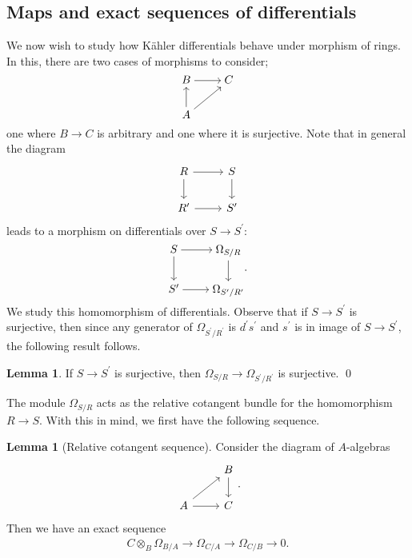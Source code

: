 \documentclass[letterpaper,10pt,twoside]{amsart}
\newcommand{\tens}{\otimes}
\theoremstyle{proposition}
\theoremstyle{definition}
\theoremstyle{theorem}
\theoremstyle{definition}
\theoremstyle{definition}
\theoremstyle{definition}
\theoremstyle{lemma}
\newtheorem{lemma}[proposition]{\textbf{Lemma}}
\theoremstyle{definition}
\theoremstyle{definition}
\theoremstyle{corollary}
\theoremstyle{definition}
\begin{document}
	\subsection{Maps and exact sequences of differentials}
	We now wish to study how K\"ahler differentials behave under morphism of rings. In this, there are two cases of morphisms to consider; 
	\[\begin{tikzcd}[cramped]
		B & C \\
		A
		\arrow[from=1-1, to=1-2]
		\arrow[from=2-1, to=1-1]
		\arrow[from=2-1, to=1-2]
	\end{tikzcd}\]
	one where $B\to C$ is arbitrary and one where it is surjective. Note that in general the diagram 
	\[\begin{tikzcd}
		R & S \\
		{R^\prime} & {S^\prime}
		\arrow[from=1-1, to=1-2]
		\arrow[from=1-1, to=2-1]
		\arrow[from=1-2, to=2-2]
		\arrow[from=2-1, to=2-2]
	\end{tikzcd}\]
	leads to a morphism on differentials over $S\to S^{\prime}$:
	\[\begin{tikzcd}[cramped]
		S & {\Omega_{S/R}} \\
		{S^\prime} & {\Omega_{S^\prime/R^\prime}}
		\arrow[from=1-1, to=1-2]
		\arrow[from=1-1, to=2-1]
		\arrow[from=1-2, to=2-2]
		\arrow[from=2-1, to=2-2]
	\end{tikzcd}.\]
	We study this homomorphism of differentials. Observe that if $S\to S^{\prime}$ is surjective, then since any generator of $\Omega_{S^{\prime}/R^{\prime}}$ is $d^{\prime}s^{\prime}$ and $s^{\prime}$ is in image of $S\to S^{\prime}$, the following result follows.
	\begin{lemma}\label{L-Surj implies surj on differentials}
		If $S\to S^{\prime}$ is surjective, then $\Omega_{S/R} \to \Omega_{S^{\prime}/R^{\prime}}$ is surjective. \qed
	\end{lemma}
	The module $\Omega_{S/R}$ acts as the relative cotangent bundle for the homomorphism $R\to S$. With this in mind, we first have the following sequence.
	\begin{lemma}[Relative cotangent sequence]\label{L-Relative cotangent sequence}
		Consider the diagram of $A$-algebras
		\[\begin{tikzcd}
			& B \\
			A & C
			\arrow[from=1-2, to=2-2]
			\arrow[from=2-1, to=1-2]
			\arrow[from=2-1, to=2-2]
		\end{tikzcd}.\]
		Then we have an exact sequence
		\begin{align*}
			C\tens_{B} \Omega_{B/A} \longrightarrow \Omega_{C/A} \longrightarrow\Omega_{C/B}\longrightarrow0.
		\end{align*}
	\end{lemma}
\end{document}
